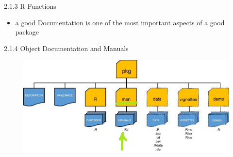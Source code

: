 \documentclass[11pt,a4paper]{beamer}
\begin{document}
\begin{frame}[t]{2.1.3 R-Functions}
	
	\begin{itemize}
		\item a good Documentation	is	one	of	the	most	important	aspects	of	a	good package
	
		
			
	\end{itemize}
	
\end{frame}






























































\begin{frame}[t]{2.1.4 Object Documentation and Manuals}
	
	
	\begin{figure}
		\centering
		\includegraphics[width=0.9\linewidth]{Manu}
		\label{fig:packages}
	\end{figure}
	
	
\end{frame}
\end{document}
